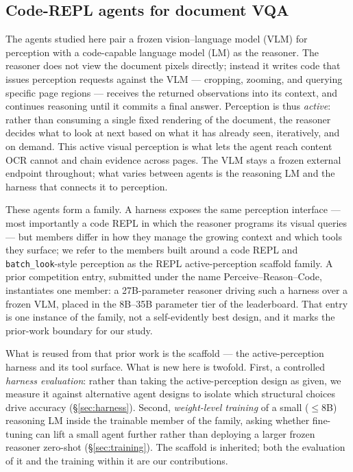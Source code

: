 \subsection{Code-REPL agents for document VQA}

The agents studied here pair a frozen vision--language model (VLM) for perception with a code-capable language model (LM) as the reasoner. The reasoner does not view the document pixels directly; instead it writes code that issues perception requests against the VLM --- cropping, zooming, and querying specific page regions --- receives the returned observations into its context, and continues reasoning until it commits a final answer. Perception is thus \emph{active}: rather than consuming a single fixed rendering of the document, the reasoner decides what to look at next based on what it has already seen, iteratively, and on demand. This active visual perception is what lets the agent reach content OCR cannot and chain evidence across pages. The VLM stays a frozen external endpoint throughout; what varies between agents is the reasoning LM and the harness that connects it to perception.

These agents form a family. A harness exposes the same perception interface --- most importantly a code REPL in which the reasoner programs its visual queries --- but members differ in how they manage the growing context and which tools they surface; we refer to the members built around a code REPL and \texttt{batch\_look}-style perception as the REPL active-perception scaffold family. A prior competition entry, submitted under the name Perceive--Reason--Code, instantiates one member: a 27B-parameter reasoner driving such a harness over a frozen VLM, placed in the 8B--35B parameter tier of the leaderboard. That entry is one instance of the family, not a self-evidently best design, and it marks the prior-work boundary for our study.

What is reused from that prior work is the scaffold --- the active-perception harness and its tool surface. What is new here is twofold. First, a controlled \emph{harness evaluation}: rather than taking the active-perception design as given, we measure it against alternative agent designs to isolate which structural choices drive accuracy (\S\ref{sec:harness}). Second, \emph{weight-level training} of a small ($\leq$8B) reasoning LM inside the trainable member of the family, asking whether fine-tuning can lift a small agent further rather than deploying a larger frozen reasoner zero-shot (\S\ref{sec:training}). The scaffold is inherited; both the evaluation of it and the training within it are our contributions.

